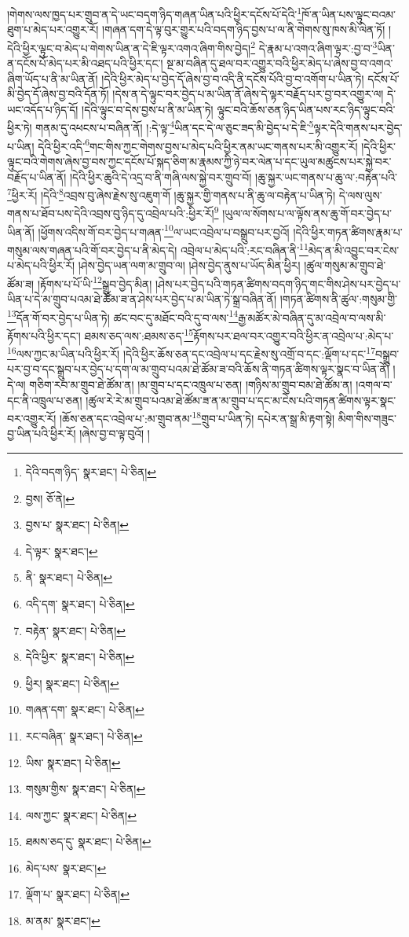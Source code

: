།གེགས་ལས་ཁྱད་པར་གྲུབ་ན་དེ་ཡང་བདག་ཉིད་གཞན་ཡིན་པའི་ཕྱིར་དངོས་པོ་དེའི་\footnote{དེའི་བདག་ཉིད་  སྣར་ཐང་།  པེ་ཅིན། }ཁོ་ན་ཡིན་པས་ལྟུང་བའམ་ཐུག་པ་མེད་པར་འགྱུར་རོ། །གཞན་དག་དེ་ལྟ་བུར་གྱུར་པའི་བདག་ཉིད་བྱས་པ་ལ་ནི་གེགས་སུ་ཁས་མི་ལེན་ཏོ། །དེའི་ཕྱིར་ལྟུང་བ་མེད་པ་གེགས་ཡིན་ན་དེ་ཇི་ལྟར་འགའ་ཞིག་གིས་བྱེད།\footnote{བྱས།  ཅོ་ནེ། } དེ་རྣམ་པ་འགའ་ཞིག་ལྟར་:བྱ་བ་\footnote{བྱས་པ་  སྣར་ཐང་།  པེ་ཅིན། }ཡིན་ན་དངོས་པོ་མེད་པར་མི་འཐད་པའི་ཕྱིར་དང་། སྔ་མ་བཞིན་དུ་ཐལ་བར་འགྱུར་བའི་ཕྱིར་མེད་པ་ཞེས་བྱ་བ་འགའ་ཞིག་ཡོད་པ་ནི་མ་ཡིན་ནོ། །དེའི་ཕྱིར་མེད་པ་བྱེད་དོ་ཞེས་བྱ་བ་འདི་ནི་དངོས་པོའི་བྱ་བ་འགོག་པ་ཡིན་ཏེ། དངོས་པོ་མི་བྱེད་དོ་ཞེས་བྱ་བའི་དོན་ཏོ། །དེས་ན་དེ་ལྟུང་བར་བྱེད་པ་མ་ཡིན་ནོ་ཞེས་དེ་ལྟར་བརྗོད་པར་བྱ་བར་འགྱུར་ལ། དེ་ཡང་འདོད་པ་ཉིད་དོ། །དེའི་ལྟུང་བ་དེས་བྱས་པ་ནི་མ་ཡིན་ཏེ། ལྟུང་བའི་ཆོས་ཅན་ཉིད་ཡིན་པས་རང་ཉིད་ལྟུང་བའི་ཕྱིར་ཏེ། གནམ་དུ་འཕངས་པ་བཞིན་ནོ། །:དེ་ལྟ་\footnote{དེ་ལྟར་  སྣར་ཐང་། }ཡིན་དང་དེ་ལ་ཅུང་ཟད་མི་བྱེད་པ་དེ་ཇི་\footnote{ནི་  སྣར་ཐང་།  པེ་ཅིན། }ལྟར་དེའི་གནས་པར་བྱེད་པ་ཡིན། དེའི་ཕྱིར་འདི་\footnote{འདི་དག་  སྣར་ཐང་།  པེ་ཅིན། }གང་གིས་ཀྱང་གེགས་བྱས་པ་མེད་པའི་ཕྱིར་ནམ་ཡང་གནས་པར་མི་འགྱུར་རོ། །དེའི་ཕྱིར་ལྟུང་བའི་གེགས་ཞེས་བྱ་བས་ཀྱང་དངོས་པོ་སྐད་ཅིག་མ་རྣམས་ཀྱི་ཉེ་བར་ལེན་པ་དང་ཡུལ་མཚུངས་པར་སྐྱེ་བར་བརྗོད་པ་ཡིན་ནོ། །དེའི་ཕྱིར་ཆུའི་དེ་འདྲ་བ་ནི་གཞི་ལས་སྐྱེ་བར་གྲུབ་བོ། །ཆུ་སྐྱར་ཡང་གནས་པ་ཆུ་ལ་:བརྟེན་པའི་\footnote{བརྟེན་  སྣར་ཐང་།  པེ་ཅིན། }ཕྱིར་རོ། །དེའི་\footnote{དེའི་ཕྱིར་  སྣར་ཐང་།  པེ་ཅིན། }འབྲས་བུ་ཞེས་རྗེས་སུ་འཇུག་གོ །ཆུ་སྐྱར་གྱི་གནས་པ་ནི་ཆུ་ལ་བརྟེན་པ་ཡིན་ཏེ། དེ་ལས་ལུས་གནས་པ་ཐོབ་པས་དེའི་འབྲས་བུ་ཉིད་དུ་འབྲེལ་པའི་:ཕྱིར་རོ།\footnote{ཕྱིར།  སྣར་ཐང་།  པེ་ཅིན། } །ཡུལ་ལ་སོགས་པ་ལ་ལྟོས་ནས་ཆུ་གོ་བར་བྱེད་པ་ཡིན་ནོ། །ཕྱོགས་འདིས་གོ་བར་བྱེད་པ་གཞན་\footnote{གཞན་དག་  སྣར་ཐང་།  པེ་ཅིན། }ལ་ཡང་འབྲེལ་པ་བསྒྲུབ་པར་བྱའོ། །དེའི་ཕྱིར་གཏན་ཚིགས་རྣམ་པ་གསུམ་ལས་གཞན་པའི་གོ་བར་བྱེད་པ་ནི་མེད་དེ། འབྲེལ་པ་མེད་པའི་:རང་བཞིན་ནི་\footnote{རང་བཞིན་  སྣར་ཐང་།  པེ་ཅིན། }མེད་ན་མི་འབྱུང་བར་ངེས་པ་མེད་པའི་ཕྱིར་རོ། །ཤེས་བྱེད་ཡན་ལག་མ་གྲུབ་ལ། །ཤེས་བྱེད་ནུས་པ་ཡོད་མིན་ཕྱིར། །ཚུལ་གསུམ་མ་གྲུབ་ཐེ་ཚོམ་ཟ། །རྟོགས་པ་པོ་ཡི་\footnote{ཡིས་  སྣར་ཐང་།  པེ་ཅིན། }སྒྲུབ་བྱེད་མིན། །ཤེས་པར་བྱེད་པའི་གཏན་ཚིགས་བདག་ཉིད་གང་གིས་ཤེས་པར་བྱེད་པ་ཡིན་པ་དེ་མ་གྲུབ་པའམ་ཐེ་ཚོམ་ཟ་ན་ཤེས་པར་བྱེད་པ་མ་ཡིན་ཏེ་སྒྲ་བཞིན་ནོ། །གཏན་ཚིགས་ནི་ཚུལ་:གསུམ་གྱི་\footnote{གསུམ་གྱིས་  སྣར་ཐང་།  པེ་ཅིན། }དོན་གོ་བར་བྱེད་པ་ཡིན་ཏེ། ཚང་བང་དུ་མཐོང་བའི་དུ་བ་ལས་\footnote{ལས་ཀྱང་  སྣར་ཐང་།  པེ་ཅིན། }རྒྱ་མཚོར་མེ་བཞིན་དུ་མ་འབྲེལ་བ་ལས་མི་རྟོགས་པའི་ཕྱིར་དང་། ཐམས་ཅད་ལས་:ཐམས་ཅད་\footnote{ཐམས་ཅད་དུ་  སྣར་ཐང་།  པེ་ཅིན། }རྟོགས་པར་ཐལ་བར་འགྱུར་བའི་ཕྱིར་ན་འབྲེལ་པ་:མེད་པ་\footnote{མེད་པས་  སྣར་ཐང་། }ལས་ཀྱང་མ་ཡིན་པའི་ཕྱིར་རོ། །དེའི་ཕྱིར་ཆོས་ཅན་དང་འབྲེལ་པ་དང་རྗེས་སུ་འགྲོ་བ་དང་:ལྡོག་པ་དང་\footnote{ལྡོག་པ་  སྣར་ཐང་།  པེ་ཅིན། }བསྒྲུབ་པར་བྱ་བ་དང་སྒྲུབ་པར་བྱེད་པ་དག་ལ་མ་གྲུབ་པའམ་ཐེ་ཚོམ་ཟ་བའི་ཆོས་ནི་གཏན་ཚིགས་ལྟར་སྣང་བ་ཡིན་ནོ། །དེ་ལ། གཅིག་རབ་མ་གྲུབ་ཐེ་ཚོམ་ན། །མ་གྲུབ་པ་དང་འཁྲུལ་པ་ཅན། །གཉིས་མ་གྲུབ་བམ་ཐེ་ཚོམ་ན། །འགལ་བ་དང་ནི་འཁྲུལ་པ་ཅན། །ཚུལ་རེ་རེ་མ་གྲུབ་པའམ་ཐེ་ཚོམ་ཟ་ན་མ་གྲུབ་པ་དང་མ་ངེས་པའི་གཏན་ཚིགས་ལྟར་སྣང་བར་འགྱུར་རོ། །ཆོས་ཅན་དང་འབྲེལ་པ་:མ་གྲུབ་ནམ་\footnote{མ་ནམ་  སྣར་ཐང་། }གྲུབ་པ་ཡིན་ཏེ། དཔེར་ན་སྒྲ་མི་རྟག་སྟེ། མིག་གིས་གཟུང་བྱ་ཡིན་པའི་ཕྱིར་རོ། །ཞེས་བྱ་བ་ལྟ་བུའོ། །
